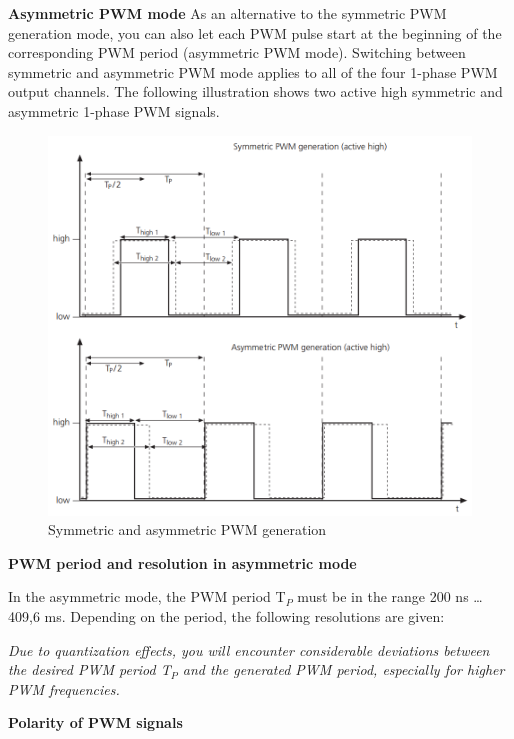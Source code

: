 \noindent \textbf{Asymmetric PWM mode}
As an alternative to the symmetric PWM generation mode, you can also let each PWM pulse start at the beginning of the corresponding PWM period (asymmetric PWM mode). Switching between symmetric and asymmetric PWM mode applies to all of the four 1-phase PWM output channels. The following illustration shows two active high symmetric and asymmetric 1-phase PWM signals.
\begin{figure}[H]
    \centering
    \includegraphics[width=\textwidth]{Images/Symmetric and asymmetric PWM generation.png}
    \caption{Symmetric and asymmetric PWM generation}
    \label{Symmetric and asymmetric PWM generation}
\end{figure}

\noindent \textbf{PWM period and resolution in asymmetric mode}\par

In the asymmetric mode, the PWM period T$_P$ must be in the range 200 ns … 409,6 ms. Depending on the period, the following resolutions are given:


\noindent \textit{Due to quantization effects, you will encounter considerable deviations between the desired PWM period T$_P$ and the generated PWM period, especially for higher PWM frequencies.}

\noindent \textbf{Polarity of PWM signals}\par

